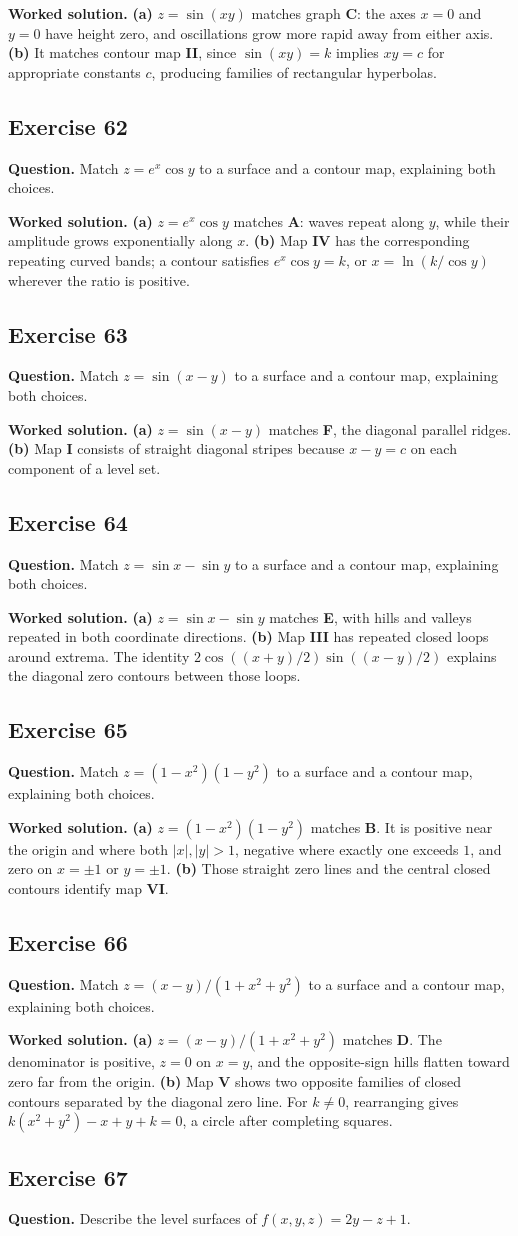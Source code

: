 \documentclass[11pt]{article}
\newcommand{\ex}[1]{\Needspace{8\baselineskip}\subsection*{Exercise #1}}
\begin{document}
\textbf{Worked solution.}
\textbf{(a)} $z=\sin(xy)$ matches graph \textbf{C}: the axes $x=0$ and $y=0$ have height zero, and oscillations grow more rapid away from either axis. \textbf{(b)} It matches contour map \textbf{II}, since $\sin(xy)=k$ implies $xy=c$ for appropriate constants $c$, producing families of rectangular hyperbolas.
\ex{62}
\textbf{Question.} Match $z=e^x\cos y$ to a surface and a contour map, explaining both choices.

\textbf{Worked solution.}
\textbf{(a)} $z=e^x\cos y$ matches \textbf{A}: waves repeat along $y$, while their amplitude grows exponentially along $x$. \textbf{(b)} Map \textbf{IV} has the corresponding repeating curved bands; a contour satisfies $e^x\cos y=k$, or $x=\ln(k/\cos y)$ wherever the ratio is positive.
\ex{63}
\textbf{Question.} Match $z=\sin(x-y)$ to a surface and a contour map, explaining both choices.

\textbf{Worked solution.}
\textbf{(a)} $z=\sin(x-y)$ matches \textbf{F}, the diagonal parallel ridges. \textbf{(b)} Map \textbf{I} consists of straight diagonal stripes because $x-y=c$ on each component of a level set.
\ex{64}
\textbf{Question.} Match $z=\sin x-\sin y$ to a surface and a contour map, explaining both choices.

\textbf{Worked solution.}
\textbf{(a)} $z=\sin x-\sin y$ matches \textbf{E}, with hills and valleys repeated in both coordinate directions. \textbf{(b)} Map \textbf{III} has repeated closed loops around extrema. The identity $2\cos((x+y)/2)\sin((x-y)/2)$ explains the diagonal zero contours between those loops.
\ex{65}
\textbf{Question.} Match $z=(1-x^2)(1-y^2)$ to a surface and a contour map, explaining both choices.

\textbf{Worked solution.}
\textbf{(a)} $z=(1-x^2)(1-y^2)$ matches \textbf{B}. It is positive near the origin and where both $|x|,|y|>1$, negative where exactly one exceeds $1$, and zero on $x=\pm1$ or $y=\pm1$. \textbf{(b)} Those straight zero lines and the central closed contours identify map \textbf{VI}.
\ex{66}
\textbf{Question.} Match $z=(x-y)/(1+x^2+y^2)$ to a surface and a contour map, explaining both choices.

\textbf{Worked solution.}
\textbf{(a)} $z=(x-y)/(1+x^2+y^2)$ matches \textbf{D}. The denominator is positive, $z=0$ on $x=y$, and the opposite-sign hills flatten toward zero far from the origin. \textbf{(b)} Map \textbf{V} shows two opposite families of closed contours separated by the diagonal zero line. For $k\ne0$, rearranging gives $k(x^2+y^2)-x+y+k=0$, a circle after completing squares.
\ex{67}
\textbf{Question.} Describe the level surfaces of $f(x,y,z)=2y-z+1$.
\end{document}
